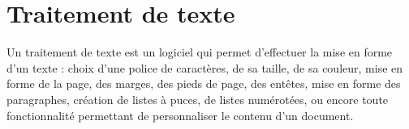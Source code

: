 \chapter{Traitement de texte}\label{ficheTexte1}  

Un traitement de texte est un logiciel qui permet d'effectuer la mise en forme d'un texte : choix d'une police de caractères, de sa taille, de sa couleur, mise en forme de la page, des marges, des pieds de page, des entêtes, mise en forme des paragraphes, création de listes à puces, de listes numérotées, ou encore toute fonctionnalité permettant de personnaliser le contenu d'un document.\\


